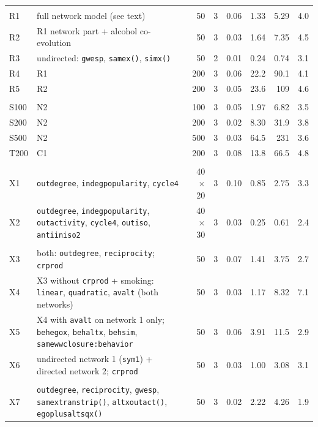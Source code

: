 {\begin{longtable}{l>{\raggedright\arraybackslash}p{}rrrrrr}
\addlinespace
\multicolumn{8}{l}{\textit{Realistic}} \\
R1 & full network model (see text) & 50 & 3 & 0.06 & 1.33 & 5.29 & 4.0 \\
R2 & R1 network part + alcohol co-evolution & 50 & 3 & 0.03 & 1.64 & 7.35 & 4.5 \\
R3 & undirected: \texttt{gwesp}, \texttt{samex()}, \texttt{simx()} & 50 & 2 & 0.01 & 0.24 & 0.74 & 3.1 \\
R4 & R1 & 200 & 3 & 0.06 & 22.2 & 90.1 & 4.1 \\
R5 & R2 & 200 & 3 & 0.05 & 23.6 & 109 & 4.6 \\
\addlinespace
\multicolumn{8}{l}{\textit{Larger networks}} \\
S100 & N2 & 100 & 3 & 0.05 & 1.97 & 6.82 & 3.5 \\
S200 & N2 & 200 & 3 & 0.02 & 8.30 & 31.9 & 3.8 \\
S500 & N2 & 500 & 3 & 0.03 & 64.5 & 231 & 3.6 \\
T200 & C1 & 200 & 3 & 0.08 & 13.8 & 66.5 & 4.8 \\
\addlinespace
\multicolumn{8}{l}{\textit{Two-mode}} \\
X1 & \texttt{outdegree}, \texttt{indegpopularity}, \texttt{cycle4} & 40$\times$20 & 3 & 0.10 & 0.85 & 2.75 & 3.3 \\
X2 & \texttt{outdegree}, \texttt{indegpopularity}, \texttt{outactivity}, \texttt{cycle4}, \texttt{outiso}, \texttt{antiiniso2} & 40$\times$30 & 3 & 0.03 & 0.25 & 0.61 & 2.4 \\
\addlinespace
\multicolumn{8}{l}{\textit{Two networks}} \\
X3 & both: \texttt{outdegree}, \texttt{reciprocity}; \texttt{crprod} & 50 & 3 & 0.07 & 1.41 & 3.75 & 2.7 \\
X4 & X3 without \texttt{crprod} + smoking: \texttt{linear}, \texttt{quadratic}, \texttt{avalt} (both networks) & 50 & 3 & 0.03 & 1.17 & 8.32 & 7.1 \\
X5 & X4 with \texttt{avalt} on network 1 only; \texttt{behegox}, \texttt{behaltx}, \texttt{behsim}, \texttt{samewwclosure:behavior} & 50 & 3 & 0.06 & 3.91 & 11.5 & 2.9 \\
X6 & undirected network 1 (\texttt{sym1}) + directed network 2; \texttt{crprod} & 50 & 3 & 0.03 & 1.00 & 3.08 & 3.1 \\
\addlinespace
\multicolumn{8}{l}{\textit{Single network}} \\
X7 & \texttt{outdegree}, \texttt{reciprocity}, \texttt{gwesp}, \texttt{samextranstrip()}, \texttt{altxoutact()}, \texttt{egoplusaltsqx()} & 50 & 3 & 0.02 & 2.22 & 4.26 & 1.9 \\
\end{longtable}
}
